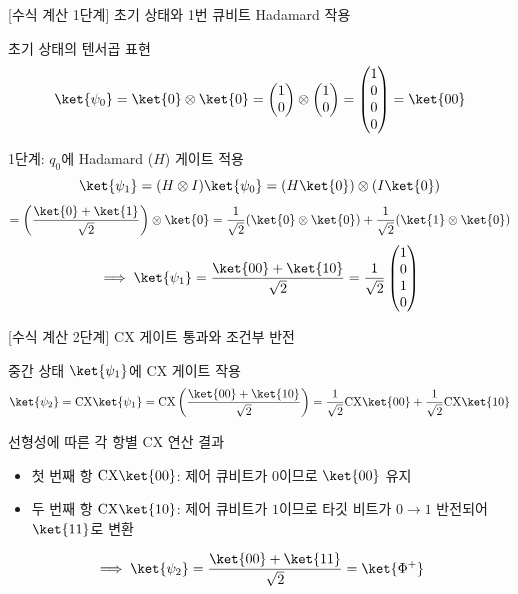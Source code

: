 \documentclass[aspectratio=169, 10pt]{beamer}
\begin{document}
\begin{frame}{[수식 계산 1단계] 초기 상태와 1번 큐비트 Hadamard 작용}
    \begin{qcblock}{초기 상태의 텐서곱 표현}
        $$\ket{\psi_0} = \ket{0} \otimes \ket{0} = \begin{pmatrix} 1 \\ 0 \end{pmatrix} \otimes \begin{pmatrix} 1 \\ 0 \end{pmatrix} = \begin{pmatrix} 1 \\ 0 \\ 0 \\ 0 \end{pmatrix} = \ket{00}$$
    \end{qcblock}
    \pause
    \vspace{0.2cm}
    \begin{qcalert}{1단계: $q_0$에 Hadamard ($H$) 게이트 적용}
        $$\ket{\psi_1} = (H \otimes I)\ket{\psi_0} = (H\ket{0}) \otimes (I\ket{0})$$
        $$= \left( \frac{\ket{0} + \ket{1}}{\sqrt{2}} \right) \otimes \ket{0} = \frac{1}{\sqrt{2}}(\ket{0} \otimes \ket{0}) + \frac{1}{\sqrt{2}}(\ket{1} \otimes \ket{0})$$
        $$\implies \ket{\psi_1} = \frac{\ket{00} + \ket{10}}{\sqrt{2}} = \frac{1}{\sqrt{2}}\begin{pmatrix} 1 \\ 0 \\ 1 \\ 0 \end{pmatrix}$$
    \end{qcalert}
\end{frame}

\begin{frame}{[수식 계산 2단계] $\mathrm{CX}$ 게이트 통과와 조건부 반전}
    \begin{qcblock}{중간 상태 $\ket{\psi_1}$에 $\mathrm{CX}$ 게이트 작용}
        $$\ket{\psi_2} = \mathrm{CX} \ket{\psi_1} = \mathrm{CX} \left( \frac{\ket{00} + \ket{10}}{\sqrt{2}} \right) = \frac{1}{\sqrt{2}} \mathrm{CX}\ket{00} + \frac{1}{\sqrt{2}} \mathrm{CX}\ket{10}$$
    \end{qcblock}
    \pause
    \vspace{0.2cm}
    \begin{qctip}{선형성에 따른 각 항별 $\mathrm{CX}$ 연산 결과}
        \begin{itemize}
            \item 첫 번째 항 $\mathrm{CX}\ket{00}$: 제어 큐비트가 $0$이므로 $\ket{00}$ 유지
            \pause
            \item 두 번째 항 $\mathrm{CX}\ket{10}$: 제어 큐비트가 $1$이므로 타깃 비트가 $0 \to 1$ 반전되어 $\ket{11}$로 변환
        \end{itemize}
    \end{qctip}
    \pause
    \vspace{0.2cm}
    $$\implies \ket{\psi_2} = \frac{\ket{00} + \ket{11}}{\sqrt{2}} = \ket{\Phi^+}$$
\end{frame}
\end{document}
